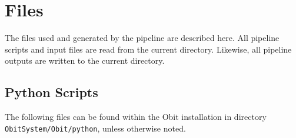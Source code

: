\documentclass[10pt,onecolumn,final]{IEEEtran}
\begin{document}
\section{Files} \label{files}

The files used and generated by the pipeline are described here.  All pipeline scripts and input files are read from the current directory.  Likewise, all pipeline outputs are written to the current directory.

\subsection{Python Scripts}

The following files can be found within the Obit installation in directory {\tt ObitSystem/Obit/python}, unless otherwise noted.
\end{document}
